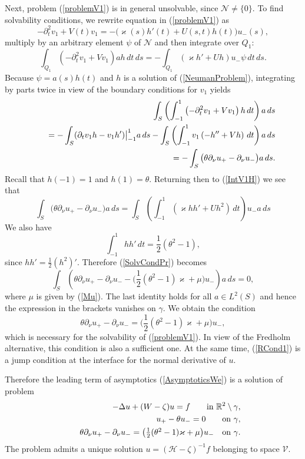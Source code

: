 \documentclass[graybox]{svmult}
\renewcommand{\kappa}{\varkappa}
\newcommand{\Real}{\mathbb R}
\newcommand{\eqref}[1]{(\ref{#1})}
\newcommand{\pte}{\partial_t}
\begin{document}
Next, problem \eqref{problemV1} is in general unsolvable, since $\mathcal{N}\neq\{0\}$.  To find solvabi\-li\-ty conditions, we rewrite  equation in \eqref{problemV1} as
$$
  -\pte^2 v_1+V(t)v_1=-\big(\kappa(s)h'(t)+U(s,t)h(t)\big)u_-(s),
$$
multiply  by an arbitrary element $\psi$ of  $\mathcal{N}$  and then integrate over $Q_1$:
\begin{equation}\label{IntV1H}
\int_{Q_1}\left(-\pte^2 v_1+Vv_1\right)ah\,dt\,ds=
-\int_{Q_1}(\kappa h'+Uh )u_-\psi\, dt\,ds.
\end{equation}
Because $\psi=a(s)h(t)$ and $h$ is a solution of \eqref{NeumanProblem}, integrating by parts twice  in view of the boundary conditions for $v_1$ yields
\begin{eqnarray}\nonumber
&&\int_{S} \left(\int_{-1}^1\left(-\pte^2 v_1+Vv_1\right)h\,dt \right) a\,ds\\\nonumber
&&\kern12pt=-\int_{S}( \partial_tv_1 h-v_1 h')\big|_{-1}^1a\,ds-
\int_{S} \left(\int_{-1}^1 v_1\left(-h''+Vh\right)\,dt \right) a\,ds\\\nonumber
&&\kern12pt=-\int_{S}\big(\theta\partial_\nu u_+-\partial_\nu u_-\big) a\,ds.
\end{eqnarray}
Recall that $h(-1)=1$ and $h(1)=\theta$. Returning then to \eqref{IntV1H} we see that 
\begin{equation}\label{SolvCondPr}
\int_{S}\big(\theta\partial_\nu u_+-\partial_\nu u_-\big) a\,ds= 
\int_{S} \left(\int_{-1}^1 \left(\kappa hh'+Uh^2\right)\,dt \right) u_-a\,ds
\end{equation}
We also have
$$
  \int_{-1}^1hh'\,d t=\textstyle\frac{1}{2 }(\theta^2-1),
$$
since $hh'=\frac12 (h^2)'$. Therefore \eqref{SolvCondPr} becomes
$$
\int_{S}\left(\theta\partial_\nu u_+-\partial_\nu u_--\big(\textstyle\frac{1}{2}(\theta^2-1)\kappa+\mu \big)u_-\right)a\,ds= 0,
$$
where $\mu$ is given by \eqref{Mu}.
The last identity holds for all $a\in L^2(S)$ and hence  the expression in the brackets vanishes on $\gamma$. We obtain  the  condition
\begin{equation}\label{RCond1}
  \theta\partial_\nu u_+-\partial_\nu u_-
=\big(\textstyle\frac{1}{2}(\theta^2-1)\kappa+\mu \big) u_-,
\end{equation}
which is necessary for the solvability of \eqref{problemV1}.
In view of the Fredholm alternative, this condition is also a sufficient one. At the same time, \eqref{RCond1} is a jump condition at the interface for the normal derivative of $u$. 

Therefore the leading term of asymptotics \eqref{AsymptoticsWe} is a solution of problem
\begin{eqnarray}\nonumber   %
&&-\Delta u+(W-\zeta)u=f \qquad \hbox{in  } \Real^2\setminus \gamma,
\\ \nonumber %
 &&\phantom{-}u_+-\theta u_-=0  \qquad \hbox{on } \gamma,
\\ \nonumber
&&\phantom{-}\theta\partial_\nu u_+-\partial_\nu u_-
=\big(\textstyle\frac{1}{2}(\theta^2-1)\kappa+\mu \big) u_- \quad \hbox{on } \gamma.
\end{eqnarray}
The problem admits a unique solution $u=(\mathcal{H}-\zeta)^{-1}f$ belonging to space $\mathcal{V}$.
\end{document}
